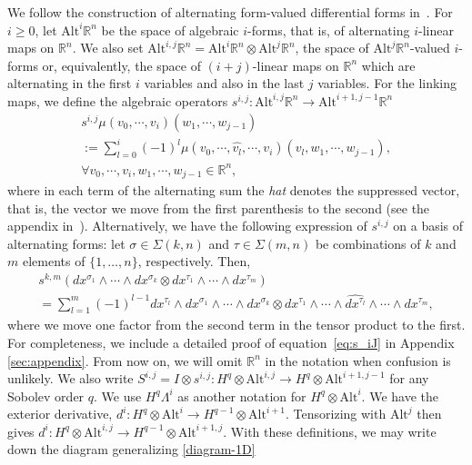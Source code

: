 \documentclass[final]{amsart}%
\newcommand{\0}{\mathaccent23}
\newcommand \alt{\mathrm{Alt}}
\newcommand\R{\mathbb{R}}
\begin{document}
We follow the construction of alternating form-valued differential forms in~\cite{arnold2021complexes}.
For $i\ge 0$, let $\alt^i \R^n$ be the space of algebraic $i$-forms, that is, of alternating $i$-linear maps on $\mathbb{R}^{n}$.  We also set $\alt^{i, j}\R^n=\alt^{i}\R^n\otimes \alt^{j}\R^n$, the space of $\alt^{j}\R^n$-valued $i$-forms or, equivalently, the space of $(i+j)$-linear maps on $\mathbb{R}^{n}$ which are alternating in the first $i$ variables and also in the last $j$ variables. For the linking maps, we define the algebraic operators $s^{i, j}: \alt^{i, j} \R^n\to \alt^{i+1, j-1}\R^n$ 
\begin{multline}
\label{def:s}
s^{i, j}\mu (v_{0},\cdots,  v_{i})(w_{1}, \cdots, w_{j-1})
\\:=\sum_{l=0}^{i}(-1)^{l} \mu (v_{0},\cdots, \widehat{v_{l}}, \cdots,  v_{i})(v_{l}, w_{1}, \cdots, w_{j-1}), \\ \forall v_{0}, \cdots, v_{i}, w_{1}, \cdots, w_{j-1} \in \mathbb{R}^{n},
\end{multline}
where in each term of the alternating sum the \textit{hat} denotes the suppressed vector, that is, the vector we move from the first parenthesis to the second (see the appendix in~\cite{arnold2021complexes}).
Alternatively, we have the following expression of $s^{i,j}$ on a basis of alternating forms:
let $\sigma\in\Sigma(k,n)$ and $\tau\in\Sigma(m,n)$ be combinations of $k$ and $m$ elements of $\{1,\dots,n\}$, respectively. Then,
\begin{multline}
    s^{k, m}(dx^{\sigma_1}\wedge\cdots \wedge dx^{\sigma_k}\otimes dx^{\tau_{1}}\wedge \cdots \wedge dx^{\tau_{m}})
    \label{eq:s_iJ}
    \\=\sum_{l=1}^{m}(-1)^{l-1}dx^{\tau_l}\wedge dx^{\sigma_1}\wedge\cdots \wedge dx^{\sigma_k}\otimes dx^{\tau_1}\wedge \cdots \wedge \widehat{dx^{\tau_l}}\wedge\cdots\wedge dx^{\tau_m},
\end{multline}
where we move one factor from the second term in the tensor product to the first. For completeness, we include a detailed proof of equation~\eqref{eq:s_iJ} in Appendix \ref{sec:appendix}. From now on, we will omit $\mathbb{R}^n$ in the notation when confusion is unlikely.
We also write $S^{i,j}=I\otimes s^{i,j}:H^q\otimes\alt^{i, j}\to H^q\otimes\alt^{i+1, j-1}$ for any Sobolev order $q$. 
We use $H^{q}\Lambda^{i}$ as another notation for $H^{q}\otimes \alt^{i}$.
We have the exterior derivative, $d^{i}: H^{q}\otimes \alt^{i}\to H^{q-1}\otimes \alt^{i+1}$. Tensorizing with $\alt^{j}$ then gives $d^{i}: H^{q}\otimes \alt^{i,j}\to H^{q-1}\otimes \alt^{i+1,j}$. With these definitions, we may write down the diagram generalizing \eqref{diagram-1D} 
\end{document}
